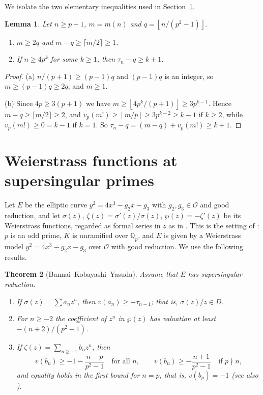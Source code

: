 \documentclass[11pt]{amsart}
\newtheorem{theorem}{Theorem}[section]
\newtheorem{lemma}[theorem]{Lemma}
\theoremstyle{definition}
\theoremstyle{remark}
\newcommand{\Q}{\mathbb{Q}}
\newcommand{\cO}{\mathcal{O}}
\newcommand{\fl}[1]{\left\lfloor #1 \right\rfloor}
\begin{document}
We isolate the two elementary inequalities used in Section~\ref{sec:bky}.

\begin{lemma}\label{lem:ineq}
Let $n\ge p+1$, $m=m(n)$ and $q=\fl{n/(p^2-1)}$.
\begin{enumerate}
\item[(a)] $m\ge2q$ and $m-q\ge\lceil m/2\rceil\ge1$.
\item[(b)] If $n\ge4p^k$ for some $k\ge1$, then $\tau_n-q\ge k+1$.
\end{enumerate}
\end{lemma}

\begin{proof}
(a) $n/(p+1)\ge(p-1)q$ and $(p-1)q$ is an integer, so $m\ge(p-1)q\ge2q$; and $m\ge1$.

(b) Since $4p\ge3(p+1)$ we have $m\ge\fl{4p^k/(p+1)}\ge3p^{k-1}$. Hence $m-q\ge\lceil m/2\rceil\ge2$,
and $v_p(m!)\ge\fl{m/p}\ge3p^{k-2}\ge k-1$ if $k\ge2$, while $v_p(m!)\ge0=k-1$ if $k=1$. So
$\tau_n-q=(m-q)+v_p(m!)\ge k+1$.
\end{proof}

\section{Weierstrass functions at supersingular primes}\label{sec:bky}

Let $E$ be the elliptic curve $y^2=4x^3-g_2x-g_3$ with $g_2,g_3\in\cO$ and good reduction, and let
$\sigma(z)$, $\zeta(z)=\sigma'(z)/\sigma(z)$, $\wp(z)=-\zeta'(z)$ be its Weierstrass functions,
regarded as formal series in $z$ as in \cite[\S1]{BKY}. This is the setting of \cite{BKY}: $p$
is an odd prime, $K$ is unramified over $\Q_p$, and $E$ is given by a Weierstrass model
$y^2=4x^3-g_2x-g_3$ over $\cO$ with good reduction. We use the following results.

\begin{theorem}[Bannai--Kobayashi--Yasuda]\label{thm:bky}
Assume that $E$ has supersingular reduction.
\begin{enumerate}
\item[(a)] \cite[Theorem~5.6]{BKY} If $\sigma(z)=\sum a_nz^n$, then $v(a_n)\ge-\tau_{n-1}$; that
is, $\sigma(z)/z\in D$.
\item[(b)] \cite[Corollary~5.3]{BKY} For $n\ge-2$ the coefficient of $z^n$ in $\wp(z)$ has
valuation at least $-(n+2)/(p^2-1)$.
\item[(c)] \cite[Corollary~5.5]{BKY} If $\zeta(z)=\sum_{n\ge-1}b_nz^n$, then
\[
v(b_n)\ge-1-\frac{n-p}{p^2-1}\quad\text{for all }n,\qquad
v(b_n)\ge-\frac{n+1}{p^2-1}\quad\text{if }p\nmid n,
\]
and equality holds in the first bound for $n=p$, that is, $v(b_p)=-1$ (see also
\cite[Proposition~4.3]{BKY}).
\end{enumerate}
\end{theorem}
\end{document}
